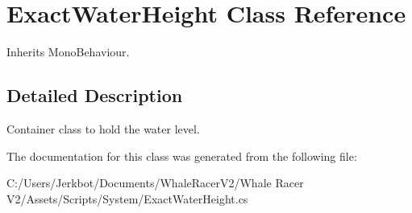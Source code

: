 \hypertarget{class_exact_water_height}{}\section{Exact\+Water\+Height Class Reference}
\label{class_exact_water_height}


Inherits Mono\+Behaviour.



\subsection{Detailed Description}
Container class to hold the water level. 



The documentation for this class was generated from the following file\+:\begin{DoxyCompactItemize}
\item 
C\+:/\+Users/\+Jerkbot/\+Documents/\+Whale\+Racer\+V2/\+Whale Racer V2/\+Assets/\+Scripts/\+System/Exact\+Water\+Height.\+cs\end{DoxyCompactItemize}
